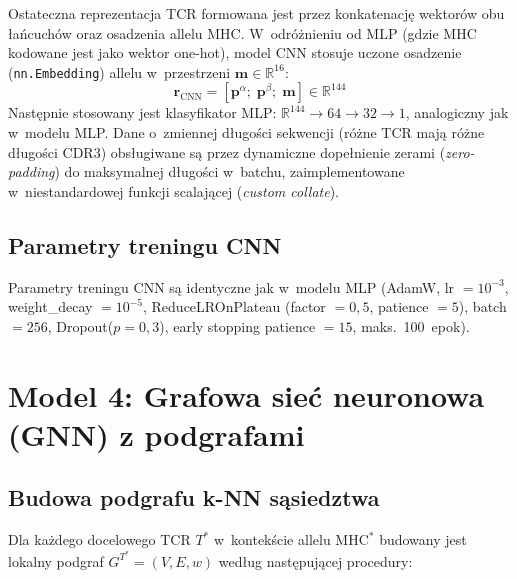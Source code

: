 \documentclass{SGGW-thesis}
\begin{document}
Ostateczna reprezentacja TCR formowana jest przez konkatenację wektorów obu łańcuchów oraz
osadzenia allelu MHC. W~odróżnieniu od MLP (gdzie MHC kodowane jest jako wektor one-hot), model
CNN stosuje uczone osadzenie (\texttt{nn.Embedding}) allelu w~przestrzeni $\mathbf{m} \in \mathbb{R}^{16}$:
\begin{equation}
    \mathbf{r}_{\mathrm{CNN}} = \left[\mathbf{p}^\alpha;\; \mathbf{p}^\beta;\; \mathbf{m}\right] \in \mathbb{R}^{144}
    \label{eq:cnn_concat}
\end{equation}
Następnie stosowany jest klasyfikator MLP: $\mathbb{R}^{144} \to 64 \to 32 \to 1$, analogiczny
jak w~modelu MLP. Dane o~zmiennej długości sekwencji (różne TCR mają różne długości CDR3) obsługiwane
są przez dynamiczne dopełnienie zerami (\textit{zero-padding}) do maksymalnej długości w~batchu,
zaimplementowane w~niestandardowej funkcji scalającej (\textit{custom collate}).

\subsection{Parametry treningu CNN}

Parametry treningu CNN są identyczne jak w~modelu MLP (AdamW, lr $= 10^{-3}$, weight\_decay $= 10^{-5}$,
ReduceLROnPlateau (factor $= 0{,}5$, patience $= 5$), batch $= 256$, Dropout($p=0{,}3$), early stopping patience $= 15$, maks.\ 100~epok).

\section{Model 4: Grafowa sieć neuronowa (GNN) z podgrafami}

\subsection{Budowa podgrafu k-NN sąsiedztwa}
\label{sec:gnn_graph_construction}

Dla każdego docelowego TCR $T^*$ w~kontekście allelu $\mathrm{MHC}^*$ budowany jest lokalny
podgraf $G^{T^*} = (V, E, w)$ według następującej procedury:
\end{document}
